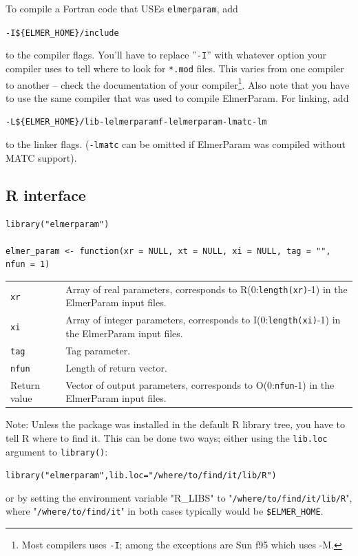 \documentclass[12pt,a4paper]{article}
\newcommand{\ttbegin}{\begin{alltt}}
\newcommand{\ttend}{\end{alltt}}
\newcommand{\code}[1]{\texttt{#1}}
\begin{document}
\noindent To compile a Fortran code that USEs \code{elmerparam}, add
\ttbegin
-I\$\{ELMER\_HOME\}/include
\ttend
to the compiler flags. You'll have to replace ''\code{-I}'' with whatever
option your compiler uses to tell where to look for \code{*.mod} files.
This varies from one compiler to another -- check the documentation of your
compiler\footnote{Most compilers uses \code{-I}; among the exceptions are
Sun f95 which uses -M.}.  Also note that you have to use the same compiler
that was used to compile ElmerParam.  For linking, add 
\ttbegin
-L\$\{ELMER\_HOME\}/lib -lelmerparamf -lelmerparam -lmatc -lm
\ttend
to the linker flags. (\code{-lmatc} can be omitted if ElmerParam was
compiled without MATC support).


\subsection{R interface}

\begin{verbatim}
library("elmerparam")

elmer_param <- function(xr = NULL, xt = NULL, xi = NULL, tag = "", nfun = 1)
\end{verbatim}
\begin{table}[H]
\begin{tabular}{ll}
    \code{xr} &\parbox[t]{10cm}{Array of real parameters, corresponds to
    R(0:\code{length(xr)}-1) in the ElmerParam input files.}\\

    \code{xi} &\parbox[t]{10cm}{Array of integer parameters, corresponds to
    I(0:\code{length(xi)}-1) in the ElmerParam input files.}\\

    \code{tag} &Tag parameter.\\

    \code{nfun} &Length of return vector.\\

    Return value &\parbox[t]{10cm}{
    Vector of output parameters, corresponds to
    O(0:\code{nfun}-1) in the ElmerParam input files.}\\

\end{tabular}
\end{table}

Note: Unless the package was installed in the default R library tree, you
have to tell R where to find it.  This can be done two ways; either using
the \code{lib.loc} argument to \code{library()}:
\ttbegin
    library("elmerparam", lib.loc="/where/to/find/it/lib/R")
\ttend
or by setting the environment variable "R\_LIBS" to
"\code{/where/to/find/it/lib/R}", where "\code{/where/to/find/it}" in both
cases typically would be \code{\${ELMER\_HOME}}.
\end{document}
